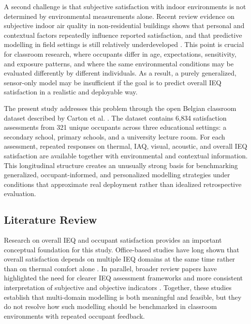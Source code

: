 \documentclass[11pt]{article}
\begin{document}
A second challenge is that subjective satisfaction with indoor environments is not determined by environmental measurements alone. Recent review evidence on subjective indoor air quality in non-residential buildings shows that personal and contextual factors repeatedly influence reported satisfaction, and that predictive modelling in field settings is still relatively underdeveloped \cite{carton2026review}. This point is crucial for classroom research, where occupants differ in age, expectations, sensitivity, and exposure patterns, and where the same environmental conditions may be evaluated differently by different individuals. As a result, a purely generalized, sensor-only model may be insufficient if the goal is to predict overall IEQ satisfaction in a realistic and deployable way.

The present study addresses this problem through the open Belgian classroom dataset described by Carton et al. \cite{carton2026dataset}. The dataset contains 6{,}834 satisfaction assessments from 321 unique occupants across three educational settings: a secondary school, primary schools, and a university lecture room. For each assessment, repeated responses on thermal, IAQ, visual, acoustic, and overall IEQ satisfaction are available together with environmental and contextual information. This longitudinal structure creates an unusually strong basis for benchmarking generalized, occupant-informed, and personalized modelling strategies under conditions that approximate real deployment rather than idealized retrospective evaluation.

\subsection{Literature Review}

Research on overall IEQ and occupant satisfaction provides an important conceptual foundation for this study. Office-based studies have long shown that overall satisfaction depends on multiple IEQ domains at the same time rather than on thermal comfort alone \cite{wong2008,frontczak2012}. In parallel, broader review papers have highlighted the need for clearer IEQ assessment frameworks and more consistent interpretation of subjective and objective indicators \cite{heinzerling2013}. Together, these studies establish that multi-domain modelling is both meaningful and feasible, but they do not resolve how such modelling should be benchmarked in classroom environments with repeated occupant feedback.
\end{document}
